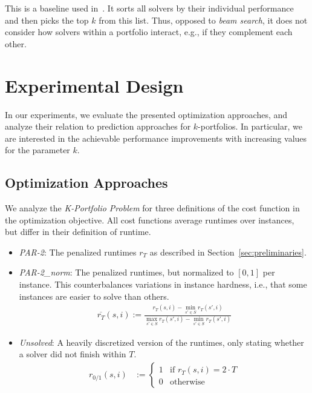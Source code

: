 \documentclass[conference]{IEEEtran}
\begin{document}
This is a baseline used in~\cite{nof2020real}.
It sorts all solvers by their individual performance and then picks the top $k$ from this list.
Thus, opposed to \emph{beam search}, it does not consider how solvers within a portfolio interact, e.g., if they complement each other.

\section{Experimental Design}
\label{sec:experimental-design}

In our experiments, we evaluate the presented optimization approaches, and analyze their relation to prediction approaches for $k$-portfolios. 
In particular, we are interested in the achievable performance improvements with increasing values for the parameter $k$. 

\subsection{Optimization Approaches}

We analyze the \emph{K-Portfolio Problem} for three definitions of the cost function in the optimization objective.
All cost functions average runtimes over instances, but differ in their definition of runtime.

\begin{itemize}
	\item \emph{PAR-2}: The penalized runtimes $r_T$ as described in Section~\ref{sec:preliminaries}.
	\item \emph{PAR-2\_norm}: The penalized runtimes, but normalized to $[0,1]$ per instance. This counterbalances variations in instance hardness, i.e., that some instances are easier to solve than others.
	\begin{align*}
		\overline{r_T}(s,i) := \frac{r_T(s,i) - \min\limits_{s' \in S}{r_T(s',i)}}{\max\limits_{s' \in S}{r_T(s',i)} - \min\limits_{s' \in S}{r_T(s',i)}}
	\end{align*}
	\item \emph{Unsolved}: A heavily discretized version of the runtimes, only stating whether a solver did not finish within $T$.
	\begin{align*}
		r_{0/1}(s,i) &:= \begin{cases}
			1 & \text{if }r_T(s,i) = 2 \cdot T\\
			0 & \text{otherwise}
		\end{cases}
	\end{align*}
\end{itemize}
\end{document}
